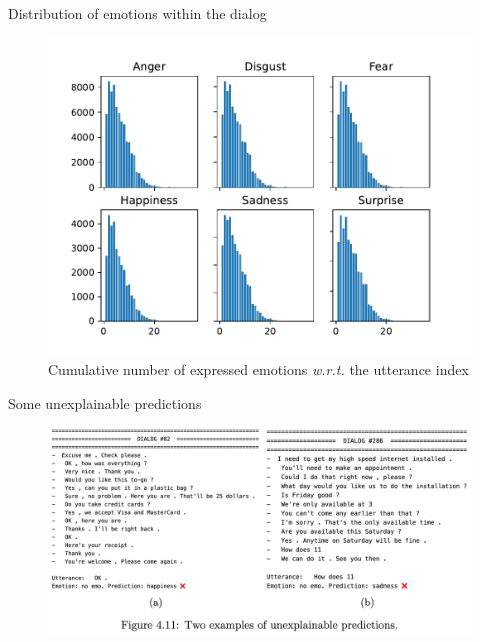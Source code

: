 \documentclass[11pt,aspectratio=169]{beamer}
\begin{document}
    
    \begin{frame}{Distribution of emotions within the dialog}
        \begin{figure}
        \centering
        \includegraphics[scale=0.55]{figures/emo_dist_sp_6_labelled.pdf}
        \caption{\centering Cumulative number of expressed emotions \textit{w.r.t.} the utterance index}
        \label{fig:emo_dist_6}
    \end{figure}
    \end{frame}
    
    \begin{frame}{Some unexplainable predictions}
        \begin{figure}
            \centering
            \includegraphics[width=\textwidth]{figures/wtf.png}
            \label{fig:wtf}
        \end{figure}
    \end{frame}
    
\end{document}
